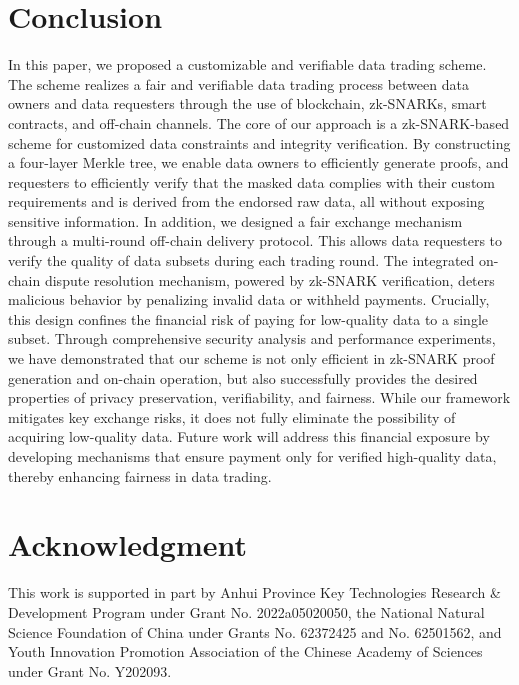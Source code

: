 \documentclass[journal]{IEEEtran}
\begin{document}
\section{Conclusion}\label{section:conclusion}
In this paper, we proposed a customizable and verifiable data trading scheme. The scheme realizes a fair and verifiable data trading process between data owners and data requesters through the use of blockchain, zk-SNARKs, smart contracts, and off-chain channels. The core of our approach is a zk-SNARK-based scheme for customized data constraints and integrity verification. By constructing a four-layer Merkle tree, we enable data owners to efficiently generate proofs, and requesters to efficiently verify that the masked data complies with their custom requirements and is derived from the endorsed raw data, all without exposing sensitive information. In addition, we designed a fair exchange mechanism through a multi-round off-chain delivery protocol. This allows data requesters to verify the quality of  data subsets during each trading round. The integrated on-chain dispute resolution mechanism, powered by zk-SNARK verification, deters malicious behavior by penalizing invalid data or withheld payments. Crucially, this design confines the financial risk of paying for low-quality data to a single subset. Through comprehensive security analysis and performance experiments, we have demonstrated that our scheme is not only efficient in zk-SNARK proof generation and on-chain operation,  but also successfully provides the desired properties of privacy preservation, verifiability, and fairness. While our framework mitigates key exchange risks, it does not fully eliminate the possibility of acquiring low-quality data. Future work will address this financial exposure by developing mechanisms that ensure payment only for verified high-quality data, thereby enhancing fairness in data trading.

\section*{Acknowledgment}
This work is supported in part by Anhui Province Key Technologies Research \& Development Program under Grant No. 2022a05020050, the National Natural Science Foundation of China under Grants No. 62372425 and No. 62501562, and Youth Innovation Promotion Association of the Chinese Academy of Sciences under Grant No. Y202093.



\end{document}
